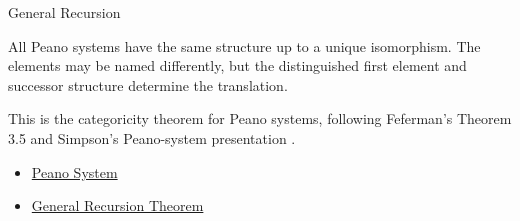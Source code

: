 \begin{topicbox}{General Recursion}
\begin{remark*}[Interpretation]
All Peano systems have the same structure up to a unique isomorphism. The
elements may be named differently, but the distinguished first element and
successor structure determine the translation.
\end{remark*}

\begin{remark*}
This is the categoricity theorem for Peano systems, following Feferman's
Theorem 3.5 and Simpson's Peano-system presentation
\citep{feferman1964numbersystems,simpson2011peanosystems}.
\end{remark*}

\begin{remark*}[Dependencies]
\begin{itemize}
  \item \hyperref[def:peano-system]{Peano System}
  \item \hyperref[thm:general-recursion-theorem-for-peano-system]{General Recursion Theorem}
\end{itemize}
\end{remark*}
\end{topicbox}
